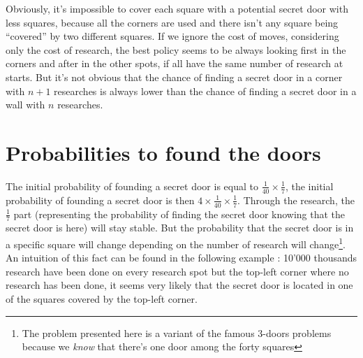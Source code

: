 \documentclass{article}
\begin{document}
\begin{center}
\end{center}
Obviously, it's impossible to cover each square with a potential secret door
with less squares, because all the corners are used and there isn't any square
being ``covered'' by two different squares. If we ignore the cost of moves,
considering only the cost of research, the best policy seems to be always
looking first in the corners and after in the other spots, if all have the same
number of research at starts. But it's not obvious that the chance of finding a
secret door in a corner with $n+1$ researches is always lower than the chance
of finding a secret door in a wall with $n$ researches.

\section{Probabilities to found the doors}
The initial probability of founding a secret door is equal to
$\frac{1}{40} \times \frac{1}{7}$, the initial probability of founding a secret
door is then $4 \times \frac{1}{40} \times \frac{1}{7}$. Through the research,
the $\frac{1}{7}$ part (representing the probability of finding the secret door
knowing that the secret door is here) will stay stable. But the probability
that the secret door is in a specific square will change depending on the
number of research will change\footnote{The problem presented here is a variant
of the famous 3-doors problems because we \emph{know} that there's one door
among the forty squares}.\\
An intuition of this fact can be found in the following example : 10'000
thousands research have been done on every research spot but the top-left
corner where no research has been done, it seems very likely that the secret
door is located in one of the squares covered by the top-left corner.\\
\end{document}

